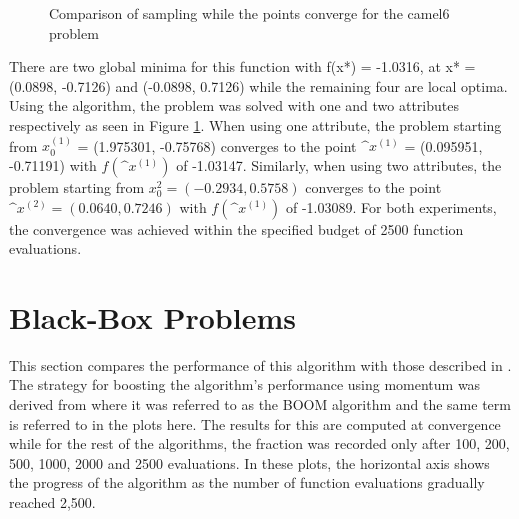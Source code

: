 \begin{figure}[t]%
    \centering
    \caption{Comparison of sampling while the points converge for the camel6 problem}
    \label{fig:Camel6}
\end{figure}

\noindent
There are two global minima for this function with f(x*) = -1.0316, at x* = (0.0898, -0.7126) and (-0.0898, 0.7126) while the remaining four are local optima.
Using the algorithm, the problem was solved with one and two attributes respectively as seen in Figure \ref{fig:Camel6}.
When using one attribute, the problem starting from $x_0^{(1)}$ = (1.975301, -0.75768) converges to the point $\^{x}^{(1)}$ = (0.095951, -0.71191) with $f( \^{x}^{(1)})$ of -1.03147. 
Similarly, when using two attributes, the problem starting from $x_0^2 = (-0.2934, 0.5758)$ converges to the point $\^{x}^{(2)} = (0.0640, 0.7246)$ with $f(\^{x}^{(1)})$ of -1.03089. For both experiments, the convergence was achieved within the specified budget of 2500 function evaluations.

\section{Black-Box Problems}
This section compares the performance of this algorithm with those described in \cite{Rios2012}. The strategy for boosting the algorithm's performance using momentum was derived from \cite{Mukherjee2013} where it was referred to as the BOOM algorithm and the same term is referred to in the plots here. The results for this are computed at convergence while for the rest of the algorithms, the fraction was recorded only after 100, 200, 500, 1000, 2000 and 2500 evaluations. In these plots, the horizontal axis shows the progress of the algorithm as the number of function evaluations gradually reached 2,500.

